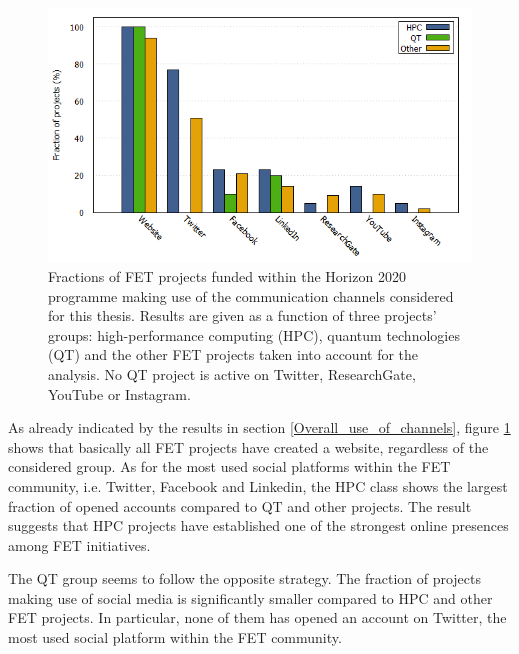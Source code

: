 \begin{figure}[!t] 
 \begin{center}
 \includegraphics[scale=0.47]{Images/Social_media_breakdown.png}
 \caption{Fractions of FET projects funded within the Horizon 2020 programme making use of the communication channels considered for this thesis. Results are given as a function of three projects' groups: high-performance computing (HPC), quantum technologies (QT) and the other FET projects taken into account for the analysis. No QT project is active on Twitter, ResearchGate, YouTube or Instagram.}
 \label{Social_media_breakdown}
 \end{center}
\end{figure}

As already indicated by the results in section \ref{Overall_use_of_channels}, figure \ref{Social_media_breakdown} shows that basically all FET projects have created a website, regardless of the considered group. As for the most used social platforms within the FET community, i.e. Twitter, Facebook and Linkedin, the HPC class shows the largest fraction of opened accounts compared to QT and other projects. The result suggests that HPC projects have established one of the strongest online presences among FET initiatives.  

The QT group seems to follow the opposite strategy. The fraction of projects making use of social media is significantly smaller compared to HPC and other FET projects. In particular, none of them has opened an account on Twitter, the most used social platform within the FET community. 

